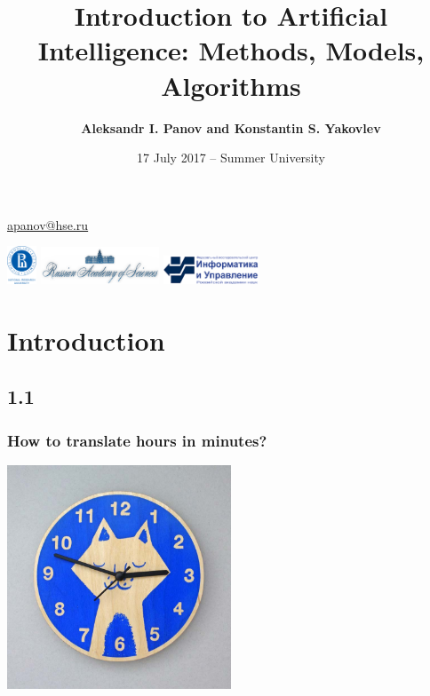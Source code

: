 \documentclass[default]{beamer}
\begin{document}
	
	\title[Introduction to AI]{Introduction to Artificial Intelligence: Methods, Models, Algorithms}
	\author[Panov]{\textbf{Aleksandr I. Panov and Konstantin S. Yakovlev}}
	\date{17 July 2017 -- Summer University} 
	
	{
	\begin{frame}
		
		\titlepage
		\centering
		\href{mailto:apanov@hse.ru}{apanov@hse.ru}
		
		\includegraphics[width=25pt]{hse.png} \hspace{10pt}
		\includegraphics[width=100pt]{ras_en.png} \hspace{10pt}
		\includegraphics[width=80pt]{frccsc.png}
		
	\end{frame}
	}	

	\section{Introduction}
	\subsection{1.1}
	\begin{frame}
		\frametitle{How to translate hours in minutes?}

		\centering
		\includegraphics[width=0.5\textwidth]{intro1.jpg}
	\end{frame}
\end{document}
